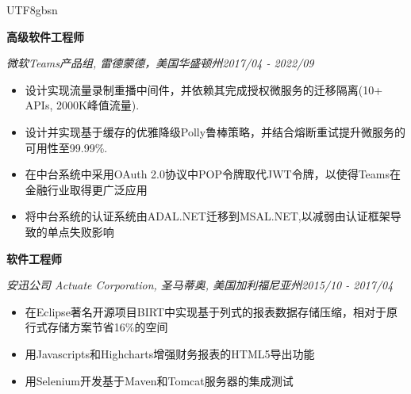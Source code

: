 \documentclass[3pt]{article}
\newenvironment{changemargin}[2]{%
  \begin{list}{}{%
    \setlength{\topsep}{0pt}%
    \setlength{\leftmargin}{#1}%
    \setlength{\rightmargin}{#2}%
    \setlength{\listparindent}{\parindent}%
    \setlength{\itemindent}{\parindent}%
    \setlength{\parsep}{\parskip}%
  }%
  \item[]}{\end{list}
}
\newenvironment{body} {
	\vspace*{-16pt}
	\begin{changemargin}{-0.25in}{-0.5in}
  }	
	{\end{changemargin}
}
\begin{document}
\begin{CJK}{UTF8}{gbsn}
\begin{body}
   \textbf{高级软件工程师} \\
   \vspace{1pt}

    \emph{微软Teams产品组, 雷德蒙德，美国华盛顿州}\hfill \emph{2017/04 - 2022/09}\\
     \begin{itemize} \itemsep -0.5pt
	\item {设计实现流量录制重播中间件，并依赖其完成授权微服务的迁移隔离(10+ APIs, 2000K峰值流量).}
	\item {设计并实现基于缓存的优雅降级Polly鲁棒策略，并结合熔断重试提升微服务的可用性至99.99\%.}
	\item {在中台系统中采用OAuth 2.0协议中POP令牌取代JWT令牌，以使得Teams在金融行业取得更广泛应用}
	\item {将中台系统的认证系统由ADAL.NET迁移到MSAL.NET,以减弱由认证框架导致的单点失败影响}
     \end{itemize}

    \textbf{软件工程师} \\
   \vspace{1pt}

    \emph{安迅公司 Actuate Corporation, 圣马蒂奥, 美国加利福尼亚州}\hfill \emph{2015/10 - 2017/04}\\
     \begin{itemize} \itemsep -0.5pt
	\item {在Eclipse著名开源项目BIRT中实现基于列式的报表数据存储压缩，相对于原行式存储方案节省16\%的空间}
     \item {用Javascripts和Highcharts增强财务报表的HTML5导出功能}
	\item {用Selenium开发基于Maven和Tomcat服务器的集成测试} 
       \end{itemize}
	

\end{body}
\end{CJK}
\end{document}
